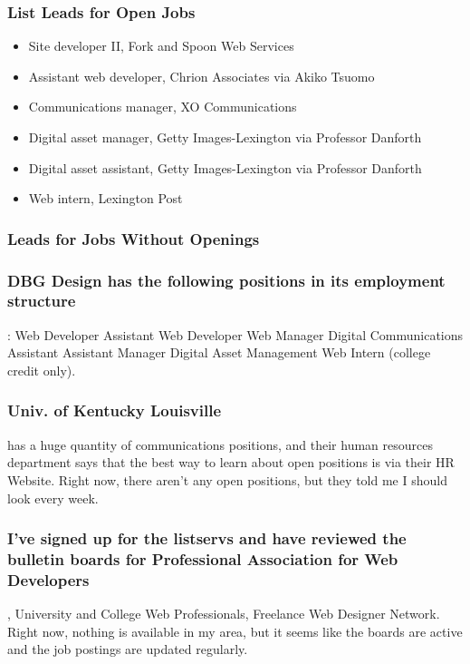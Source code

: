 \subsubsection*{List Leads for Open Jobs}
\begin{itemize}
	\item Site developer II, Fork and Spoon Web Services
	\item Assistant web developer, Chrion Associates via Akiko Tsuomo
	\item Communications manager, XO Communications
	\item Digital asset manager, Getty Images-Lexington via Professor Danforth
	\item Digital asset assistant, Getty Images-Lexington via Professor Danforth
	\item Web intern, Lexington Post
\end{itemize}

\subsubsection*{Leads for Jobs Without Openings}

\subsubsection*{DBG Design has the following positions in its employment structure}:
\break Web Developer
\break Assistant Web Developer
\break Web Manager
\break Digital Communications Assistant
\break Assistant Manager
\break Digital Asset Management
\break Web Intern (college credit only).

\subsubsection*{Univ. of Kentucky Louisville} has a huge quantity of communications positions, and their human resources department says that the best way to learn about open positions is via their HR Website. Right now, there aren't any open positions, but they told me I should look every week.

\subsubsection*{I've signed up for the listservs and have reviewed the bulletin boards for Professional Association for Web Developers}, University and College Web Professionals, Freelance Web Designer Network. Right now, nothing is available in my area, but it seems like the boards are active and the job postings are updated regularly.

